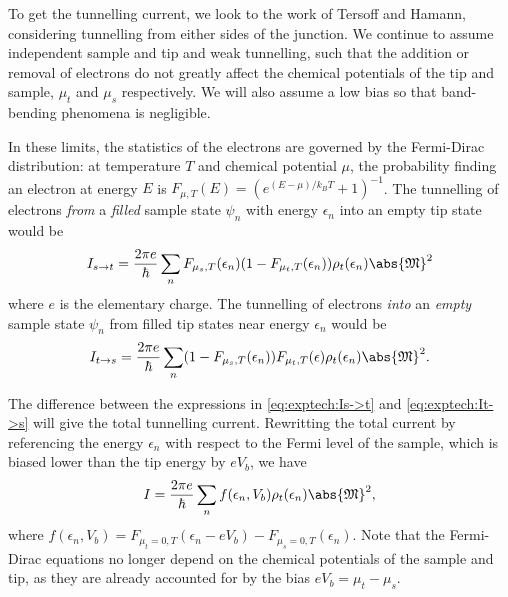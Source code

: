To get the tunnelling current, we look to the work of Tersoff and Hamann, considering tunnelling from either sides of the junction. We continue to assume independent sample and tip and weak tunnelling, such that the addition or removal of electrons do not greatly affect the chemical potentials of the tip and sample, $\mu_t$ and $\mu_s$ respectively. We will also assume a low bias so that band-bending phenomena is negligible.

In these limits, the statistics of the electrons are governed by the Fermi-Dirac distribution: at temperature $T$ and chemical potential $\mu$, the probability finding an electron at energy $E$ is $F_{\mu, T}(E) = ({e^{(E-\mu)/k_BT} +1})^{-1}$. The tunnelling of electrons \emph{from} a \emph{filled} sample state $\psi_n$ with energy $\epsilon_n$ into an empty tip state would be
\begin{equation} \label{eq:exptech:Is->t}
    I_{s\rightarrow t} = \frac{2\pi e}{\hbar} \sum_n F_{\mu_s, T}(\epsilon_n) (1-F_{\mu_t, T}(\epsilon_n))  \rho_{t}(\epsilon_n) \abs{\mathfrak{M}}^2 
\end{equation}
where $e$ is the elementary charge. The tunnelling of electrons \emph{into} an \emph{empty} sample state $\psi_n$ from filled tip states near energy $\epsilon_n$ would be 
\begin{equation} \label{eq:exptech:It->s}
    I_{t\rightarrow s} = \frac{2\pi e}{\hbar} \sum_n (1-F_{\mu_s, T}(\epsilon_n))   F_{\mu_t, T}(\epsilon)  \rho_{t}(\epsilon_n) \abs{\mathfrak{M}}^2 .
\end{equation}

The difference between the expressions in \autoref{eq:exptech:Is->t} and \ref{eq:exptech:It->s} will give the total tunnelling current. Rewritting the total current by referencing the energy $\epsilon_n$ with respect to the Fermi level of the sample, which is biased lower than the tip energy by $eV_b$, we have
\begin{equation} 
I = \frac{2\pi e}{\hbar}\sum_n f(\epsilon_n, V_b) \rho_{t}(\epsilon_n) \abs{\mathfrak{M}}^2,
\end{equation}
where $ f(\epsilon_n,V_b) = F_{\mu_t=0,T}(\epsilon_n-eV_b) - F_{\mu_s=0,T}(\epsilon_n)$. Note that the Fermi-Dirac equations no longer depend on the chemical potentials of the sample and tip, as they are already accounted for by the bias $eV_b = \mu_t - \mu_s$. 


